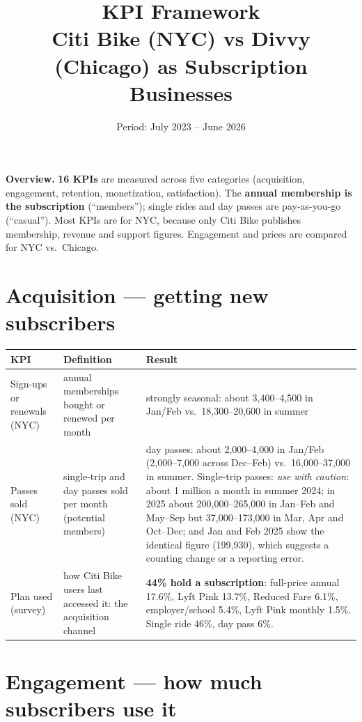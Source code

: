 \documentclass[11pt,a4paper]{article}
\title{\color{accent}\textbf{KPI Framework}\\[4pt]
\large Citi Bike (NYC) vs Divvy (Chicago) as Subscription Businesses}
\date{Period: July 2023 -- June 2026}
\begin{document}
\sloppy
\maketitle

\textbf{Overview.} \textbf{16 KPIs} are measured across five categories (acquisition, engagement, retention, monetization, satisfaction). The \textbf{annual membership is the subscription} (``members''); single rides and day passes are pay-as-you-go (``casual''). Most KPIs are for NYC, because only Citi Bike publishes membership, revenue and support figures. Engagement and prices are compared for NYC vs.\ Chicago.

\section{Acquisition --- getting new subscribers}

\begin{tabularx}{\linewidth}{@{}P{3.9cm}P{4.6cm}L@{}}
\toprule
KPI & Definition & Result \\
\midrule
Sign-ups or renewals (NYC) & annual memberships bought or renewed per month & strongly seasonal: about 3,400--4,500 in Jan/Feb vs.\ 18,300--20,600 in summer \\
Passes sold (NYC) & single-trip and day passes sold per month (potential members) & day passes: about 2,000--4,000 in Jan/Feb (2,000--7,000 across Dec--Feb) vs.\ 16,000--37,000 in summer. Single-trip passes: \textit{use with caution}: about 1 million a month in summer 2024; in 2025 about 200,000--265,000 in Jan--Feb and May--Sep but 37,000--173,000 in Mar, Apr and Oct--Dec; and Jan and Feb 2025 show the identical figure (199,930), which suggests a counting change or a reporting error. \\
Plan used (survey) & how Citi Bike users last accessed it: the acquisition channel & \textbf{44\% hold a subscription}: full-price annual 17.6\%, Lyft Pink 13.7\%, Reduced Fare 6.1\%, employer/school 5.4\%, Lyft Pink monthly 1.5\%. Single ride 46\%, day pass 6\%. \\
\bottomrule
\end{tabularx}

\section{Engagement --- how much subscribers use it}
\end{document}
